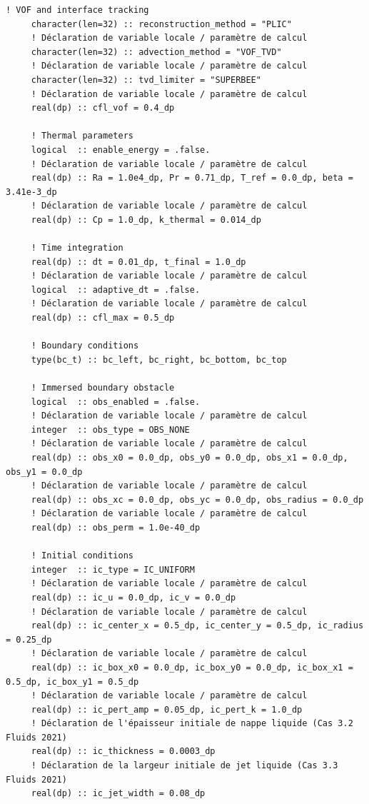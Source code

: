 \documentclass[10pt,a4paper,oneside]{book}
\begin{document}
\begin{lstlisting}[language={[95]Fortran}]
     ! VOF and interface tracking
     character(len=32) :: reconstruction_method = "PLIC"
     ! Déclaration de variable locale / paramètre de calcul
     character(len=32) :: advection_method = "VOF_TVD"
     ! Déclaration de variable locale / paramètre de calcul
     character(len=32) :: tvd_limiter = "SUPERBEE"
     ! Déclaration de variable locale / paramètre de calcul
     real(dp) :: cfl_vof = 0.4_dp

     ! Thermal parameters
     logical  :: enable_energy = .false.
     ! Déclaration de variable locale / paramètre de calcul
     real(dp) :: Ra = 1.0e4_dp, Pr = 0.71_dp, T_ref = 0.0_dp, beta = 3.41e-3_dp
     ! Déclaration de variable locale / paramètre de calcul
     real(dp) :: Cp = 1.0_dp, k_thermal = 0.014_dp

     ! Time integration
     real(dp) :: dt = 0.01_dp, t_final = 1.0_dp
     ! Déclaration de variable locale / paramètre de calcul
     logical  :: adaptive_dt = .false.
     ! Déclaration de variable locale / paramètre de calcul
     real(dp) :: cfl_max = 0.5_dp

     ! Boundary conditions
     type(bc_t) :: bc_left, bc_right, bc_bottom, bc_top

     ! Immersed boundary obstacle
     logical  :: obs_enabled = .false.
     ! Déclaration de variable locale / paramètre de calcul
     integer  :: obs_type = OBS_NONE
     ! Déclaration de variable locale / paramètre de calcul
     real(dp) :: obs_x0 = 0.0_dp, obs_y0 = 0.0_dp, obs_x1 = 0.0_dp, obs_y1 = 0.0_dp
     ! Déclaration de variable locale / paramètre de calcul
     real(dp) :: obs_xc = 0.0_dp, obs_yc = 0.0_dp, obs_radius = 0.0_dp
     ! Déclaration de variable locale / paramètre de calcul
     real(dp) :: obs_perm = 1.0e-40_dp

     ! Initial conditions
     integer  :: ic_type = IC_UNIFORM
     ! Déclaration de variable locale / paramètre de calcul
     real(dp) :: ic_u = 0.0_dp, ic_v = 0.0_dp
     ! Déclaration de variable locale / paramètre de calcul
     real(dp) :: ic_center_x = 0.5_dp, ic_center_y = 0.5_dp, ic_radius = 0.25_dp
     ! Déclaration de variable locale / paramètre de calcul
     real(dp) :: ic_box_x0 = 0.0_dp, ic_box_y0 = 0.0_dp, ic_box_x1 = 0.5_dp, ic_box_y1 = 0.5_dp
     ! Déclaration de variable locale / paramètre de calcul
     real(dp) :: ic_pert_amp = 0.05_dp, ic_pert_k = 1.0_dp
     ! Déclaration de l'épaisseur initiale de nappe liquide (Cas 3.2 Fluids 2021)
     real(dp) :: ic_thickness = 0.0003_dp
     ! Déclaration de la largeur initiale de jet liquide (Cas 3.3 Fluids 2021)
     real(dp) :: ic_jet_width = 0.08_dp


\end{lstlisting}
\end{document}
